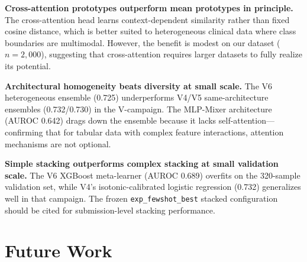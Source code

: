 \textbf{Cross-attention prototypes outperform mean prototypes in principle.} The cross-attention head learns context-dependent similarity rather than fixed cosine distance, which is better suited to heterogeneous clinical data where class boundaries are multimodal. However, the benefit is modest on our dataset ($n=2{,}000$), suggesting that cross-attention requires larger datasets to fully realize its potential.

\textbf{Architectural homogeneity beats diversity at small scale.} The V6 heterogeneous ensemble (0.725) underperforms V4/V5 same-architecture ensembles (0.732/0.730) in the V-campaign. The MLP-Mixer architecture (AUROC 0.642) drags down the ensemble because it lacks self-attention---confirming that for tabular data with complex feature interactions, attention mechanisms are not optional.

\textbf{Simple stacking outperforms complex stacking at small validation scale.} The V6 XGBoost meta-learner (AUROC 0.689) overfits on the 320-sample validation set, while V4's isotonic-calibrated logistic regression (0.732) generalizes well in that campaign. The frozen \texttt{exp\_fewshot\_best} stacked configuration should be cited for submission-level stacking performance.

\section{Future Work}


